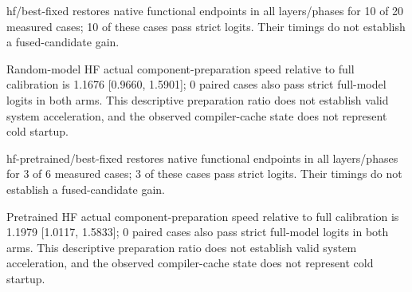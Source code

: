 hf/best-fixed restores native functional endpoints in all layers/phases for 10 of 20 measured cases; 10 of these cases pass strict logits. Their timings do not establish a fused-candidate gain.

Random-model HF actual component-preparation speed relative to full calibration is 1.1676 [0.9660, 1.5901]; 0 paired cases also pass strict full-model logits in both arms. This descriptive preparation ratio does not establish valid system acceleration, and the observed compiler-cache state does not represent cold startup.

hf-pretrained/best-fixed restores native functional endpoints in all layers/phases for 3 of 6 measured cases; 3 of these cases pass strict logits. Their timings do not establish a fused-candidate gain.

Pretrained HF actual component-preparation speed relative to full calibration is 1.1979 [1.0117, 1.5833]; 0 paired cases also pass strict full-model logits in both arms. This descriptive preparation ratio does not establish valid system acceleration, and the observed compiler-cache state does not represent cold startup.
